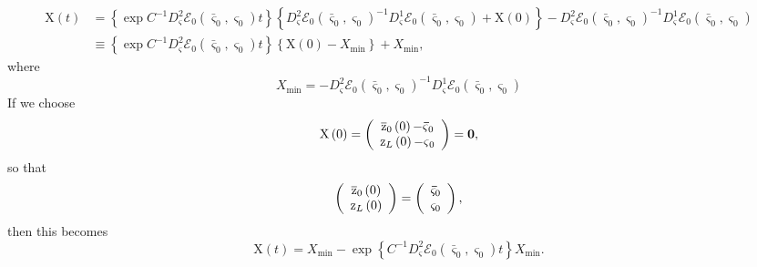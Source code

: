 \documentclass[aps,preprint]{revtex4}%
\begin{document}
\begin{align}
\mathrm{X}\left(  t\right)    & =\left\{  \exp C^{-1}D_{\mathbf{\varsigma}%
}^{2}\mathcal{E}_{0}\left(  \mathbf{\bar{\varsigma}}_{0},\mathbf{\varsigma
}_{0}\right)  t\right\}  \left\{  D_{\mathbf{\varsigma}}^{2}\mathcal{E}%
_{0}\left(  \mathbf{\bar{\varsigma}}_{0},\mathbf{\varsigma}_{0}\right)
^{-1}D_{\mathbf{\varsigma}}^{1}\mathcal{E}_{0}\left(  \mathbf{\bar{\varsigma}%
}_{0},\mathbf{\varsigma}_{0}\right)  +\mathrm{X}\left(  0\right)  \right\}
-D_{\mathbf{\varsigma}}^{2}\mathcal{E}_{0}\left(  \mathbf{\bar{\varsigma}}%
_{0},\mathbf{\varsigma}_{0}\right)  ^{-1}D_{\mathbf{\varsigma}}^{1}%
\mathcal{E}_{0}\left(  \mathbf{\bar{\varsigma}}_{0},\mathbf{\varsigma}%
_{0}\right)  \nonumber\\
& \equiv\left\{  \exp C^{-1}D_{\mathbf{\varsigma}}^{2}\mathcal{E}_{0}\left(
\mathbf{\bar{\varsigma}}_{0},\mathbf{\varsigma}_{0}\right)  t\right\}
\left\{  \mathrm{X}\left(  0\right)  -X_{\min}\right\}  +X_{\min},
\end{align}
where
\begin{equation}
X_{\min}=-D_{\mathbf{\varsigma}}^{2}\mathcal{E}_{0}\left(  \mathbf{\bar
{\varsigma}}_{0},\mathbf{\varsigma}_{0}\right)  ^{-1}D_{\mathbf{\varsigma}%
}^{1}\mathcal{E}_{0}\left(  \mathbf{\bar{\varsigma}}_{0},\mathbf{\varsigma
}_{0}\right)
\end{equation}
If we choose
\begin{equation}
\mathrm{X}\left(  0\right)  =\left(
\begin{array}
[c]{c}%
\overline{\mathrm{z}}_{0}\left(  0\right)  \mathbf{-\bar{\varsigma}}_{0}\\
\mathrm{z}_{L}\left(  0\right)  \mathbf{-\varsigma}_{0}%
\end{array}
\right)  =\mathbf{0,}%
\end{equation}
so that
\begin{equation}
\left(
\begin{array}
[c]{c}%
\overline{\mathrm{z}}_{0}\left(  0\right)  \\
\mathrm{z}_{L}\left(  0\right)
\end{array}
\right)  =\left(
\begin{array}
[c]{c}%
\mathbf{\bar{\varsigma}}_{0}\\
\mathbf{\varsigma}_{0}%
\end{array}
\right)  ,
\end{equation}
then this becomes
\begin{equation}
\mathrm{X}\left(  t\right)  =X_{\min}-\exp\left\{  C^{-1}D_{\mathbf{\varsigma
}}^{2}\mathcal{E}_{0}\left(  \mathbf{\bar{\varsigma}}_{0},\mathbf{\varsigma
}_{0}\right)  t\right\}  X_{\min}.
\end{equation}
\end{document}
